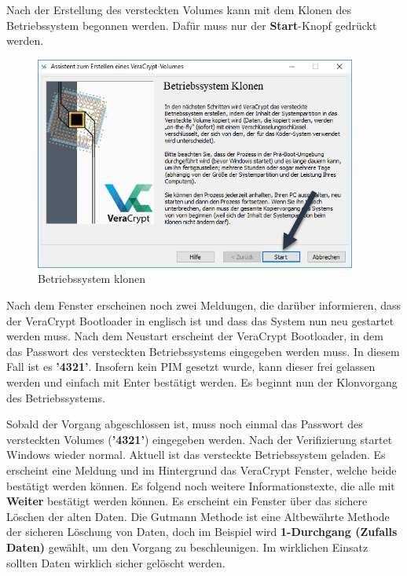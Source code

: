 \documentclass[12pt,a4paper]{scrreprt}
\begin{document}
\noindent Nach der Erstellung des versteckten Volumes kann mit dem Klonen des Betriebssystem begonnen werden. Dafür muss nur der \textbf{Start}-Knopf gedrückt werden.

\begin{figure}[h]
\begin{center}
\includegraphics[width=300pt]{media/hb6.png}
\caption{Betriebssystem klonen}
\label{hb6}
\end{center}
\end{figure}

\noindent Nach dem Fenster erscheinen noch zwei Meldungen, die darüber informieren, dass der VeraCrypt Bootloader in englisch ist und dass das System nun neu gestartet werden muss. Nach dem Neustart erscheint der VeraCrypt Bootloader, in dem das Passwort des versteckten Betriebssystems eingegeben werden muss. In diesem Fall ist es \textbf{'4321'}. Insofern kein PIM gesetzt wurde, kann dieser frei gelassen werden und einfach mit Enter bestätigt werden. Es beginnt nun der Klonvorgang des Betriebssystems. \\

\newpage

\noindent Sobald der Vorgang abgeschlossen ist, muss noch einmal das Passwort des versteckten Volumes (\textbf{'4321'}) eingegeben werden. Nach der Verifizierung startet Windows wieder normal. Aktuell ist das versteckte Betriebssystem geladen. Es erscheint eine Meldung und im Hintergrund das VeraCrypt Fenster, welche beide bestätigt werden können. Es folgend noch weitere Informationstexte, die alle mit \textbf{Weiter} bestätigt werden können. Es erscheint ein Fenster über das sichere Löschen der alten Daten. Die Gutmann Methode ist eine Altbewährte Methode der sicheren Löschung von Daten, doch im Beispiel wird \textbf{1-Durchgang (Zufalls Daten)} gewählt, um den Vorgang zu beschleunigen. Im wirklichen Einsatz sollten Daten wirklich sicher gelöscht werden.
\end{document}
